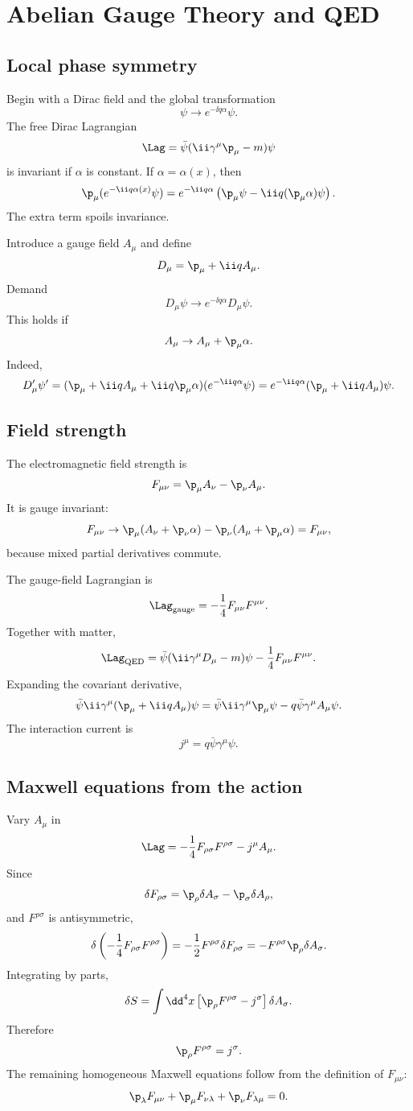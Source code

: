 \chapter{Abelian Gauge Theory and QED}

\section{Local phase symmetry}

Begin with a Dirac field and the global transformation
\[
  \psi\to e^{-\ii q\alpha}\psi.
\]
The free Dirac Lagrangian
\[
  \Lag=\bar\psi(\ii\gamma^\mu\p_\mu-m)\psi
\]
is invariant if \(\alpha\) is constant.  If \(\alpha=\alpha(x)\), then
\[
  \p_\mu(e^{-\ii q\alpha(x)}\psi)
  =
  e^{-\ii q\alpha}
  \left(\p_\mu\psi-\ii q(\p_\mu\alpha)\psi\right).
\]
The extra term spoils invariance.

Introduce a gauge field \(A_\mu\) and define
\[
  D_\mu=\p_\mu+\ii q A_\mu.
\]
Demand
\[
  D_\mu\psi\to e^{-\ii q\alpha}D_\mu\psi.
\]
This holds if
\[
  A_\mu\to A_\mu+\p_\mu\alpha.
\]
Indeed,
\[
  D_\mu'\psi'
  =
  (\p_\mu+\ii qA_\mu+\ii q\p_\mu\alpha)
  (e^{-\ii q\alpha}\psi)
  =
  e^{-\ii q\alpha}(\p_\mu+\ii qA_\mu)\psi.
\]

\section{Field strength}

The electromagnetic field strength is
\[
  F_{\mu\nu}=\p_\mu A_\nu-\p_\nu A_\mu.
\]
It is gauge invariant:
\[
  F_{\mu\nu}\to
  \p_\mu(A_\nu+\p_\nu\alpha)
  -
  \p_\nu(A_\mu+\p_\mu\alpha)
  =
  F_{\mu\nu},
\]
because mixed partial derivatives commute.

The gauge-field Lagrangian is
\[
  \Lag_{\text{gauge}}=-\frac14F_{\mu\nu}F^{\mu\nu}.
\]
Together with matter,
\[
  \Lag_{\text{QED}}
  =
  \bar\psi(\ii\gamma^\mu D_\mu-m)\psi
  -\frac14F_{\mu\nu}F^{\mu\nu}.
\]
Expanding the covariant derivative,
\[
  \bar\psi\ii\gamma^\mu(\p_\mu+\ii qA_\mu)\psi
  =
  \bar\psi\ii\gamma^\mu\p_\mu\psi
  -q\bar\psi\gamma^\mu A_\mu\psi.
\]
The interaction current is
\[
  j^\mu=q\bar\psi\gamma^\mu\psi.
\]

\section{Maxwell equations from the action}

Vary \(A_\mu\) in
\[
  \Lag=-\frac14F_{\rho\sigma}F^{\rho\sigma}-j^\mu A_\mu.
\]
Since
\[
  \delta F_{\rho\sigma}=\p_\rho\delta A_\sigma-\p_\sigma\delta A_\rho,
\]
and \(F^{\rho\sigma}\) is antisymmetric,
\[
  \delta\left(-\frac14F_{\rho\sigma}F^{\rho\sigma}\right)
  =
  -\frac12F^{\rho\sigma}\delta F_{\rho\sigma}
  =
  -F^{\rho\sigma}\p_\rho\delta A_\sigma.
\]
Integrating by parts,
\[
  \delta S
  =
  \int\dd^4x
  \left[
  \p_\rho F^{\rho\sigma}-j^\sigma
  \right]\delta A_\sigma.
\]
Therefore
\[
  \p_\rho F^{\rho\sigma}=j^\sigma.
\]
The remaining homogeneous Maxwell equations follow from the definition of \(F_{\mu\nu}\):
\[
  \p_\lambda F_{\mu\nu}
  +\p_\mu F_{\nu\lambda}
  +\p_\nu F_{\lambda\mu}=0.
\]


